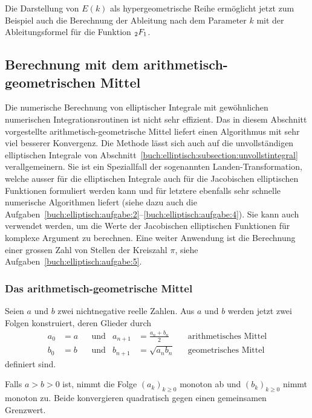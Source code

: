 Die Darstellung von $E(k)$ als hypergeometrische Reihe ermöglicht
jetzt zum Beispiel auch die Berechnung der Ableitung nach dem
Parameter $k$ mit der Ableitungsformel für die Funktion $\mathstrut_2F_1$.


%
%
\subsection{Berechnung mit dem arithmetisch-geometrischen Mittel
\label{buch:elliptisch:subsection:agm}}
Die numerische Berechnung von elliptischer Integrale mit gewöhnlichen
numerischen Integrationsroutinen ist nicht sehr effizient.
Das in diesem Abschnitt vorgestellte arithmetisch-geometrische Mittel
%
liefert einen Algorithmus mit sehr viel besserer Konvergenz.
Die Methode lässt sich auch auf die unvollständigen elliptischen
Integrale von Abschnitt~\eqref{buch:elliptisch:subsection:unvollstintegral}
verallgemeinern.
Sie ist ein Speziallfall der sogenannten Landen-Transformation,
%
welche ausser für die elliptischen Integrale auch für die 
Jacobischen elliptischen Funktionen formuliert werden kann und
für letztere ebenfalls sehr schnelle numerische Algorithmen liefert
(siehe dazu auch die
Aufgaben~\ref{buch:elliptisch:aufgabe:2}--\ref{buch:elliptisch:aufgabe:4}).
Sie kann auch verwendet werden, um die Werte der Jacobischen elliptischen
Funktionen für komplexe Argument zu berechnen.
Eine weiter Anwendung ist die Berechnung einer grossen Zahl von 
Stellen der Kreiszahl $\pi$, siehe Aufgaben~\ref{buch:elliptisch:aufgabe:5}.

%
%
\subsubsection{Das arithmetisch-geometrische Mittel}
Seien $a$ und $b$ zwei nichtnegative reelle Zahlen.
Aus $a$ und $b$ werden jetzt zwei Folgen konstruiert, deren Glieder
durch
\begin{align*}
a_0&=a &&\text{und}& a_{n+1} &= \frac{a_n+b_n}2 &&\text{arithmetisches Mittel}
\\
b_0&=b &&\text{und}& b_{n+1} &= \sqrt{a_nb_n}   &&\text{geometrisches Mittel}
\end{align*}
definiert sind.

\begin{satz}
%
Falls $a>b>0$ ist, nimmt die Folge $(a_k)_{k\ge 0}$ monoton ab und
$(b_k)_{k\ge 0}$ nimmt monoton zu.
Beide konvergieren quadratisch gegen einen gemeinsamen Grenzwert.
\end{satz}


